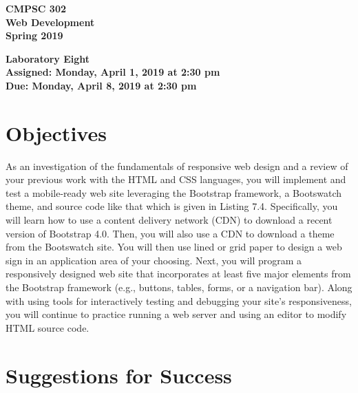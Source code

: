 \documentclass[11pt]{article}
\newcommand{\assignmentduedate}{April 8}
\newcommand{\assignmentassignedate}{April 1}
\newcommand{\assignmentnumber}{Eight}
\newcommand{\labyear}{2019}
\newcommand{\labday}{Monday}
\newcommand{\labtime}{2:30 pm}
\newcommand{\assigneddate}{Assigned: \labday, \assignmentassignedate, \labyear{} at \labtime{}}
\newcommand{\duedate}{Due: \labday, \assignmentduedate, \labyear{} at \labtime{}}
\newcommand{\labtitle}[1]
{
  \begin{center}
    \begin{center}
      \bf
      CMPSC 302\\Web Development\\
      Spring 2019\\
      \medskip
    \end{center}
    \bf
    #1
  \end{center}
}
\begin{document}
\thispagestyle{empty}

\labtitle{Laboratory \assignmentnumber{} \\ \assigneddate{} \\ \duedate{}}

\section*{Objectives}

As an investigation of the fundamentals of responsive web design and a review of
your previous work with the HTML and CSS languages, you will implement and test
a mobile-ready web site leveraging the Bootstrap framework, a Bootswatch theme,
and source code like that which is given in Listing 7.4. Specifically, you will
learn how to use a content delivery network (CDN) to download a recent version
of Bootstrap 4.0. Then, you will also use a CDN to download a theme from the
Bootswatch site. You will then use lined or grid paper to design a web sign in
an application area of your choosing. Next, you will program a responsively
designed web site that incorporates at least five major elements from the
Bootstrap framework (e.g., buttons, tables, forms, or a navigation bar). Along
with using tools for interactively testing and debugging your site's
responsiveness, you will continue to practice running a web server and using an
editor to modify HTML source code.

\section*{Suggestions for Success}
\end{document}
